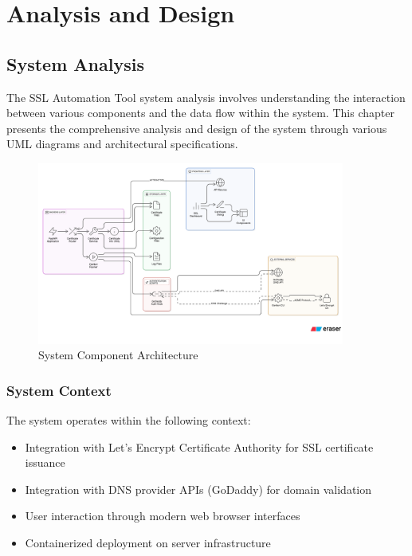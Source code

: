 
\chapter{Analysis and Design}\doublespacing %

\label{Chapter3} %



\section{System Analysis}

The SSL Automation Tool system analysis involves understanding the interaction between various components and the data flow within the system. This chapter presents the comprehensive analysis and design of the system through various UML diagrams and architectural specifications.

\begin{figure}[h]
\centering
\includegraphics[width=0.9\textwidth]{diagram-images/3.4-component-diagram.png}
\caption{System Component Architecture}
\label{fig:detailed-component-diagram}
\end{figure}

\subsection{System Context}

The system operates within the following context:
\begin{itemize}
    \item Integration with Let's Encrypt Certificate Authority for SSL certificate issuance
    \item Integration with DNS provider APIs (GoDaddy) for domain validation
    \item User interaction through modern web browser interfaces
    \item Containerized deployment on server infrastructure
\end{itemize}

